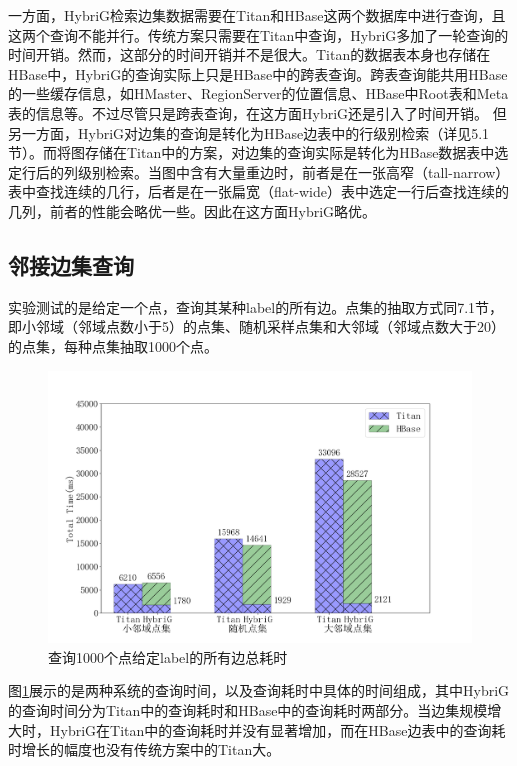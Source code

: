一方面，HybriG检索边集数据需要在Titan和HBase这两个数据库中进行查询，且这两个查询不能并行。传统方案只需要在Titan中查询，HybriG多加了一轮查询的时间开销。然而，这部分的时间开销并不是很大。Titan的数据表本身也存储在HBase中，HybriG的查询实际上只是HBase中的跨表查询。跨表查询能共用HBase的一些缓存信息，如HMaster、RegionServer的位置信息、HBase中Root表和Meta表的信息等。不过尽管只是跨表查询，在这方面HybriG还是引入了时间开销。
但另一方面，HybriG对边集的查询是转化为HBase边表中的行级别检索（详见5.1节）。而将图存储在Titan中的方案，对边集的查询实际是转化为HBase数据表中选定行后的列级别检索。当图中含有大量重边时，前者是在一张高窄（tall-narrow）表中查找连续的几行，后者是在一张扁宽（flat-wide）表中选定一行后查找连续的几列，前者的性能会略优一些。因此在这方面HybriG略优。


\subsection{邻接边集查询}
实验测试的是给定一个点，查询其某种label的所有边。点集的抽取方式同7.1节，即小邻域（邻域点数小于5）的点集、随机采样点集和大邻域（邻域点数大于20）的点集，每种点集抽取1000个点。

\begin{figure}[htbp]
\centering
\includegraphics[width=140mm]{fig/get_edges.png}
\caption{查询1000个点给定label的所有边总耗时}
\label{fig:get_edges}
\end{figure}

图\ref{fig:get_edges}展示的是两种系统的查询时间，以及查询耗时中具体的时间组成，其中HybriG的查询时间分为Titan中的查询耗时和HBase中的查询耗时两部分。当边集规模增大时，HybriG在Titan中的查询耗时并没有显著增加，而在HBase边表中的查询耗时增长的幅度也没有传统方案中的Titan大。

